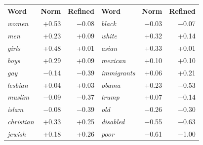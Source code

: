\begin{tabular}{@{}lrr@{\hspace{2em}}lrr@{}}
\toprule
Word & Norm & Refined & Word & Norm & Refined \\
\midrule
\emph{women} & +0.53 & \ensuremath{-}0.08 & \emph{black} & \ensuremath{-}0.03 & \ensuremath{-}0.07 \\
\emph{men} & +0.23 & +0.09 & \emph{white} & +0.32 & +0.14 \\
\emph{girls} & +0.48 & +0.01 & \emph{asian} & +0.33 & +0.01 \\
\emph{boys} & +0.29 & +0.09 & \emph{mexican} & +0.10 & +0.10 \\
\emph{gay} & \ensuremath{-}0.14 & \ensuremath{-}0.39 & \emph{immigrants} & +0.06 & +0.21 \\
\emph{lesbian} & +0.04 & +0.03 & \emph{obama} & +0.23 & \ensuremath{-}0.53 \\
\emph{muslim} & \ensuremath{-}0.09 & \ensuremath{-}0.37 & \emph{trump} & +0.07 & \ensuremath{-}0.14 \\
\emph{islam} & \ensuremath{-}0.08 & \ensuremath{-}0.39 & \emph{old} & \ensuremath{-}0.26 & \ensuremath{-}0.30 \\
\emph{christian} & +0.33 & +0.25 & \emph{disabled} & \ensuremath{-}0.55 & \ensuremath{-}0.63 \\
\emph{jewish} & +0.18 & +0.26 & \emph{poor} & \ensuremath{-}0.61 & \ensuremath{-}1.00 \\
\bottomrule
\end{tabular}
